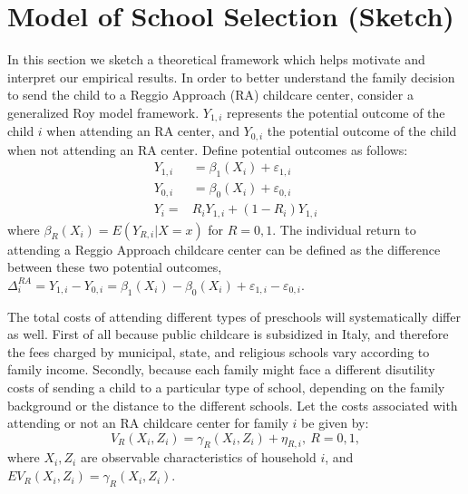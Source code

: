 \documentclass[12pt]{article}
\begin{document}
\section{Model of School Selection (Sketch)}
\label{sec:model}

In this section we sketch a theoretical framework which helps motivate and interpret our empirical results. In order to better understand the family decision to send the child to a Reggio Approach (RA) childcare center, consider a generalized Roy model framework. $Y_{1,i}$ represents the potential outcome of the child $i$ when attending an RA center, and $Y_{0,i}$ the potential outcome of the child when not attending an RA center. Define potential outcomes as follows:
\begin{align}
Y_{1,i}& =\beta_{1}(X_{i})+\varepsilon_{1,i} \nonumber \\
Y_{0,i}& =\beta_{0}(X_{i})+\varepsilon_{0,i} \nonumber \\
Y_{i} =& R_{i}Y_{1,i} + (1-R_{i}) Y_{1,i} \label{eq:outcome}
\end{align}%
where $\beta_{R}(X_{i})=E(Y_{R,i}|X=x)$ for $R=0,1$. The individual return to attending a Reggio Approach childcare center can be defined as the difference between these two potential outcomes, $\Delta_{i}^{RA}=Y_{1,i}-Y_{0,i}=\beta_{1}(X_{i})-\beta_{0}(X_{i})+\varepsilon_{1,i}-\varepsilon_{0,i}$.

The total costs of attending different types of preschools will systematically differ as well. First of all because public childcare is subsidized in Italy, and therefore the fees charged by municipal, state, and religious schools vary according to family income. %
Secondly, because each family might face a different disutility costs of sending a child to a particular type of school, depending on the family background or the distance to the different schools. 
Let the costs associated with attending or not an RA childcare center for family $i$ be given by:
\begin{equation*}
V_{R}(X_{i},Z_{i})=\gamma_{R}(X_{i},Z_{i})+\eta_{R,i},\ R=0,1,
\end{equation*}%
where $X_{i},Z_{i}$ are observable characteristics of household $i$, and $EV_{R}(X_{i},Z_{i})=\gamma_{R}(X_{i},Z_{i}).$
\end{document}
